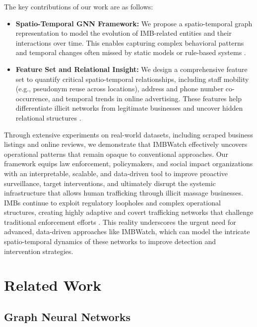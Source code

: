 \documentclass[letterpaper]{article} %
\begin{document}
The key contributions of our work are as follows:

\begin{itemize}
    \item \textbf{Spatio-Temporal GNN Framework:} We propose a spatio-temporal graph representation to model the evolution of IMB-related entities and their interactions over time. This enables capturing complex behavioral patterns and temporal changes often missed by static models or rule-based systems \cite{yu2018spatio, li2018diffusion}.
    
    \item \textbf{Feature Set and Relational Insight:} We design a comprehensive feature set to quantify critical spatio-temporal relationships, including staff mobility (e.g., pseudonym reuse across locations), address and phone number co-occurrence, and temporal trends in online advertising. These features help differentiate illicit networks from legitimate businesses and uncover hidden relational structures \cite{dubrawski2015leveraging}.
\end{itemize}

Through extensive experiments on real-world datasets, including scraped business listings and online reviews, we demonstrate that IMBWatch effectively uncovers operational patterns that remain opaque to conventional approaches. Our framework equips law enforcement, policymakers, and social impact organizations with an interpretable, scalable, and data-driven tool to improve proactive surveillance, target interventions, and ultimately disrupt the systemic infrastructure that allows human trafficking through illicit massage businesses. IMBs continue to exploit regulatory loopholes and complex operational structures, creating highly adaptive and covert trafficking networks that challenge traditional enforcement efforts \cite{deVries2022}. This reality underscores the urgent need for advanced, data-driven approaches like IMBWatch, which can model the intricate spatio-temporal dynamics of these networks to improve detection and intervention strategies.


\section{Related Work}
\subsection{Graph Neural Networks}
\end{document}
